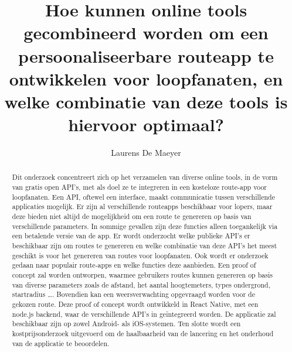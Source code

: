 \documentclass{hogent-article}
\title{Hoe kunnen online tools gecombineerd worden om een persoonaliseerbare routeapp te ontwikkelen voor loopfanaten, en welke combinatie van deze tools is hiervoor optimaal?}
\author{Laurens De Maeyer}
\begin{document}
\begin{abstract}
  Dit onderzoek concentreert zich op het verzamelen van diverse online tools, in de vorm van gratis open API's, met als doel ze te integreren in een kosteloze route-app voor loopfanaten. Een API, oftewel een interface, maakt communicatie tussen verschillende applicaties mogelijk.
  Er zijn al verschillende routeapps beschikbaar voor lopers, maar deze bieden niet altijd de mogelijkheid om een route te genereren op basis van verschillende parameters. In sommige gevallen zijn deze functies alleen toegankelijk via een betalende versie van de app.
  Er wordt onderzocht welke publieke API's er beschikbaar zijn om routes te genereren en welke combinatie van deze API's het meest geschikt is voor het genereren van routes voor loopfanaten. Ook wordt er onderzoek gedaan naar populair route-apps en welke functies deze aanbieden.
  Een proof of concept zal worden ontworpen, waarmee gebruikers routes kunnen genereren op basis van diverse parameters zoals de afstand, het aantal hoogtemeters, types ondergrond, startradius \ldots. Bovendien kan een weersverwachting opgevraagd worden voor de gekozen route.
  Deze proof of concept wordt ontwikkeld in React Native, met een node.js backend, waar de verschillende API's in geïntegreerd worden. De applicatie zal beschikbaar zijn op zowel Android- als iOS-systemen.
  Ten slotte wordt een kostprijsonderzoek uitgevoerd om de haalbaarheid van de lancering en het onderhoud van de applicatie te beoordelen.
\end{abstract}

\tableofcontents



\printbibliography[heading=bibintoc]
\end{document}
